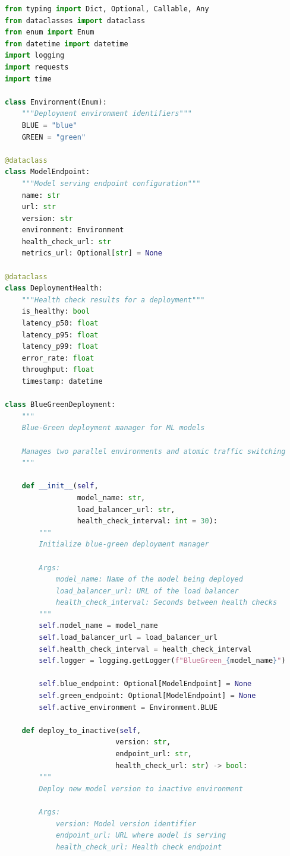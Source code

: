\begin{lstlisting}[language=Python, caption=Blue-Green Deployment Manager]
from typing import Dict, Optional, Callable, Any
from dataclasses import dataclass
from enum import Enum
from datetime import datetime
import logging
import requests
import time

class Environment(Enum):
    """Deployment environment identifiers"""
    BLUE = "blue"
    GREEN = "green"

@dataclass
class ModelEndpoint:
    """Model serving endpoint configuration"""
    name: str
    url: str
    version: str
    environment: Environment
    health_check_url: str
    metrics_url: Optional[str] = None

@dataclass
class DeploymentHealth:
    """Health check results for a deployment"""
    is_healthy: bool
    latency_p50: float
    latency_p95: float
    latency_p99: float
    error_rate: float
    throughput: float
    timestamp: datetime

class BlueGreenDeployment:
    """
    Blue-Green deployment manager for ML models

    Manages two parallel environments and atomic traffic switching
    """

    def __init__(self,
                 model_name: str,
                 load_balancer_url: str,
                 health_check_interval: int = 30):
        """
        Initialize blue-green deployment manager

        Args:
            model_name: Name of the model being deployed
            load_balancer_url: URL of the load balancer
            health_check_interval: Seconds between health checks
        """
        self.model_name = model_name
        self.load_balancer_url = load_balancer_url
        self.health_check_interval = health_check_interval
        self.logger = logging.getLogger(f"BlueGreen_{model_name}")

        self.blue_endpoint: Optional[ModelEndpoint] = None
        self.green_endpoint: Optional[ModelEndpoint] = None
        self.active_environment = Environment.BLUE

    def deploy_to_inactive(self,
                          version: str,
                          endpoint_url: str,
                          health_check_url: str) -> bool:
        """
        Deploy new model version to inactive environment

        Args:
            version: Model version identifier
            endpoint_url: URL where model is serving
            health_check_url: Health check endpoint


\end{lstlisting}
